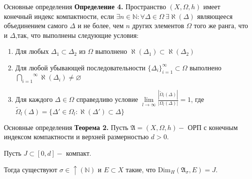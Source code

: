 \documentclass{beamer}
\begin{document}
\begin{frame}{Основные определения}
    \textbf{Определение 4.} Пространство
    $(X,\Omega, h)$
    имеет конечный индекс компактности,
    если $\exists n \in \mathbb{N} : \forall \Delta \in \Omega
    \ \exists \aleph (\Delta)$
    являющееся объединением самого $\Delta$
    и не более, чем $n$ других элементов $\Omega$ того же ранга,
    что и $\Delta$,так, что выполнены следующие условия:
    \begin{enumerate}
        \item 
            Для любых $\Delta_1 \subset \Delta_2$
            из $\Omega$ выполнено
            $\aleph (\Delta_1) \subset \aleph(\Delta_2) $
        \item 
            Для любой убывающей последовательности
            $\{\Delta_i\}_{i=1}^\infty \subset \Omega$
            выполнено
            $\overset{\infty}{\underset{i = 1}{\bigcap}}
            \aleph (\Delta_i) \neq \varnothing$ 
        \item 
            Для каждого $\Delta \in \Omega$
            справедливо условие
            $
            \underset{l \to \infty}{\lim}
            \frac{ | \tilde{\Omega}_l(\Delta) | }
            { | \Omega_l(\Delta) | } =
            1
            $,
            где
            $
            \tilde{\Omega}_l(\Delta) =
            \{\Delta' \in  \Omega_l : 
            \aleph (\Delta') \subset \Delta \}
            $
    \end{enumerate}
\end{frame}

% 
% 
\begin{frame}{Основные определения}
    \textbf{Теорема 2.} Пусть
    $\mathfrak{A} = (X, \Omega, h) - $ ОРП
    с конечным индексом компактности и верхней размерностью
    $d > 0$.
    \newline
    
    Пусть $J \subset [0, d] - $ компакт.
    \newline
    
    Тогда существуют $\sigma  \in \uparrow (\mathbb{N}) $
    и $E \subset X$ такие, что $\mbox{Dim}_H (\mathfrak{A_\sigma}, E) = J$.
\end{frame}
\end{document}
